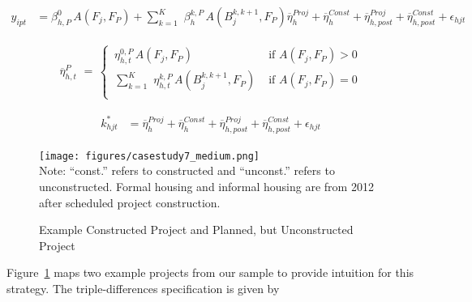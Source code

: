 \documentclass[12pt]{article}
\begin{document}
\begin{align*}
 y_{ipt}  &=  \beta^{0}_{h,P}  \, A(F_j, F_P)  + \sum_{k=1}^{K} \, \, \beta^{k,P}_{h}  \, A(B^{k,k+1}_j, F_P) \overline{\eta}_{h}^{Proj} + \overline{\eta}_{h}^{Const} + \overline{\eta}_{h,post}^{Proj} + \overline{\eta}_{h,post}^{Const}  + \epsilon_{hjt}
\end{align*}


\begin{align*}
\overline{\eta}_{h,t}^{P} \, \, = \,
\begin{cases}
 \, \eta^{0,P}_{h,t} \, A(F_j, F_P)  &\text{ if }   A(F_j, F_P) > 0 \\
 \, \sum_{k=1}^{K} \, \, \eta^{k,P}_{h,t} \, A(B^{k,k+1}_j, F_P) & \text{ if } A(F_j, F_P)=0 \\
\end{cases}
\end{align*}

\begin{align*}
k_{hjt}^{*} &=    \overline{\eta}_{h}^{Proj} + \overline{\eta}_{h}^{Const} + \overline{\eta}_{h,post}^{Proj} + \overline{\eta}_{h,post}^{Const}  + \epsilon_{hjt}
\end{align*}


\begin{figure}
\caption{Example Constructed Project and Planned, but Unconstructed Project}\label{fig:bblumaps}
{\centering
\texttt{[image: figures/casestudy7\_medium.png]}}\\[.5em]
{ \footnotesize Note: ``const.'' refers to constructed and ``unconst.'' refers to unconstructed.  Formal housing and informal housing are from 2012 after scheduled project construction. }
\end{figure}




Figure~\ref{fig:bblumaps} maps two example projects from our sample to provide intuition for this strategy.  The triple-differences specification is given by
\end{document}
